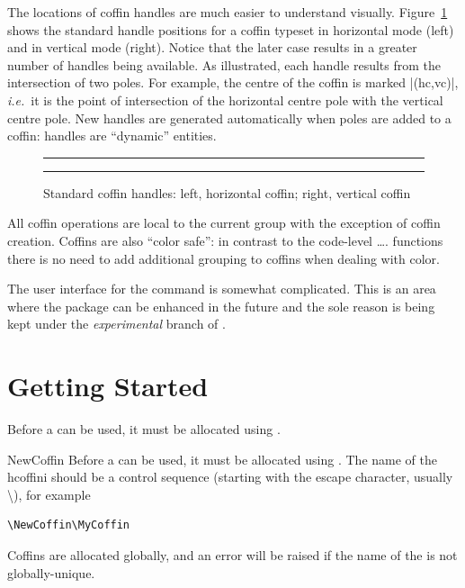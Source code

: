  The locations of coffin handles are much easier to understand
 visually. Figure~\ref{fgr:handles} shows the standard handle
 positions for a coffin typeset in horizontal mode (left) and in
 vertical mode (right). Notice that the later case results in a greater
 number of handles being available. As illustrated, each handle
 results from the intersection of two poles. For example, the centre
 of the coffin is marked |(hc,vc)|, \emph{i.e.}~it is the
 point of intersection of the horizontal centre pole with the
 vertical centre pole. New handles are generated automatically when
 poles are added to a coffin: handles are \enquote{dynamic} entities.
 \NewCoffin \ExampleCoffin
\begin{figure}[htbp]
   \hfil
     \colorbox{black}{\color{white}\begin{minipage}{0.4\textwidth}
     \SetHorizontalCoffin\ExampleCoffin
       {\color{white}\rule{1 in}{1 in}}
  \DisplayCoffinHandles{}
   \end{minipage}}
   \hfil
   \begin{minipage}{0.4\textwidth}
     \SetVerticalCoffin\ExampleCoffin{1 in}
       {\color{black!10!white}\rule{1 in}{1 in}}
     \DisplayCoffinHandles{}
   \end{minipage}
   \hfil
   \caption{Standard coffin handles: left, horizontal coffin; right,
     vertical coffin}
   \label{fgr:handles}
 \end{figure}


All coffin operations are local to the current \tex group with the exception
of coffin creation. Coffins are also “color safe”: in contrast to the code-level \ldots.
functions there is no need to add additional grouping to coffins when dealing with color.

The user interface for the command is somewhat complicated. This is an area where the package
can be enhanced in the future and the sole reason is being kept under the \emph{experimental}
branch of .

\section{Getting Started}

Before a  can be used, it must be allocated using .

\begin{docCommand}{NewCoffin}{}
Before a  can be used, it must be allocated using . The name of the
hcoffini should be a control sequence (starting with the escape character, usually \textbackslash ), for
example

\begin{verbatim}
\NewCoffin\MyCoffin
\end{verbatim}

Coffins are allocated globally, and an error will be raised if the name of the  is
not globally-unique.
\end{docCommand}

